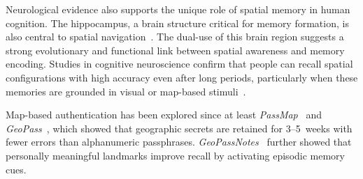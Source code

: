 \documentclass[mathematics,article,accept,pdftex,moreauthors]{Definitions/mdpi}
\begin{document}
Neurological evidence also supports the unique role of spatial memory in human cognition. The hippocampus, a brain structure critical for memory formation, is also central to spatial navigation~\cite{McNaughton1991}. The dual-use of this brain region suggests a strong evolutionary and functional link between spatial awareness and memory encoding. Studies in cognitive neuroscience confirm that people can recall spatial configurations with high accuracy even after long periods, particularly when these memories are grounded in visual or map-based stimuli~\cite{Konkle2010, Lukavsky2017}.



{Map-based authentication has been explored since at least \textit{PassMap}~\cite{Sun2012} and \textit{GeoPass}~\cite{Thorpe2013}, which showed that geographic secrets are retained for 3--5~weeks with fewer errors than alphanumeric passphrases. \textit{GeoPassNotes}~\cite{MacRae2016} further showed that personally meaningful landmarks improve recall by activating episodic memory cues.}
\end{document}
